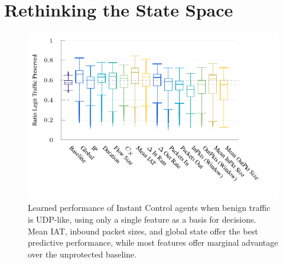 \documentclass[10pt, times, conference, letterpaper]{IEEEtran}
\begin{document}
\section{Rethinking the State Space}\label{sec:rethinking-the-state-space}

\begin{figure}
	\centering
	\includegraphics[width=0.9\linewidth]{../plots/ftprep-cap-box}
	\vspace{-1cm}
	\caption{
		Learned performance of Instant Control agents when benign traffic is UDP-like, using only a single feature as a basis for decisions.
		Mean IAT, inbound packet sizes, and global state offer the best predictive performance, while most features offer marginal advantage over the unprotected baseline.
		\label{fig:udp-feature-plots}
	}
\end{figure}

\end{document}
